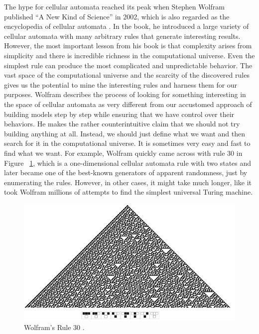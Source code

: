 \documentclass[12pt]{article}
\numberwithin{figure}{section} %
\begin{document}
The hype for cellular automata reached its peak when Stephen Wolfram published “A New Kind of Science” in 2002, which is also regarded as the encyclopedia of cellular automata \cite{A new kind of Science}. In the book, he introduced a large variety of cellular automata with many arbitrary rules that generate interesting results. However, the most important lesson from his book is that complexity arises from simplicity and there is incredible richness in the computational universe. Even the simplest rule can produce the most complicated and unpredictable behavior. The vast space of the computational universe and the scarcity of the discovered rules gives us the potential to mine the interesting rules and harness them for our purposes. Wolfram describes the process of looking for something interesting in the space of cellular automata as very different from our accustomed approach of building models step by step while ensuring that we have control over their behaviors. He makes the rather counterintuitive claim that we should not try building anything at all. Instead, we should just define what we want and then search for it in the computational universe. It is sometimes very easy and fast to find what we want. For example, Wolfram quickly came across with rule 30 \cite{Rule 30} in Figure ~\ref{fig:Rule 30}, which is a one-dimensional cellular automata rule with two states and later became one of the best-known generators of apparent randomness, just by enumerating the rules. However, in other cases, it might take much longer, like it took Wolfram millions of attempts to find the simplest universal Turing machine. 
 
\begin{figure}[H]
	\includegraphics[width=\linewidth]{Section2/1}
	\caption[Wolfram's Rule 30]{Wolfram’s Rule 30 \cite{Rule 30}.}
	\vspace{-1.5em}
	\label{fig:Rule 30}
\end{figure}
\end{document}
